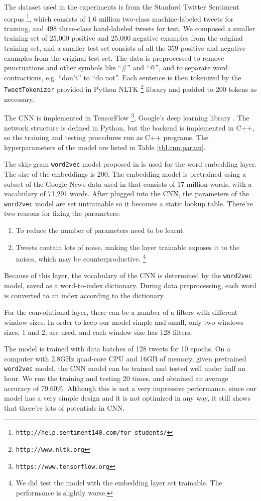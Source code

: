 The dataset used in the experiments is from the Stanford Twitter Sentiment corpus \footnote{\tt http://help.sentiment140.com/for-students/}, which consists of 1.6 million two-class machine-labeled tweets for training, and 498 three-class hand-labeled tweets for test. We composed a smaller training set of 25,000 positive and 25,000 negative examples from the original training set, and a smaller test set consists of all the 359 positive and negative examples from the original test set. The data is preprocessed to remove punctuations and other symbols like ``\#'' and ``@'', and to separate word contractions, e.g. ``don't'' to ``do not''. Each sentence is then tokenized by the {\tt TweetTokenizer} provided in Python NLTK \footnote{\tt http://www.nltk.org} library and padded to 200 tokens as necessary. 

The CNN is implemented in TensorFlow \footnote{\tt https://www.tensorflow.org}, Google's deep learning library \cite{abadi2016}. The network structure is defined in Python, but the backend is implemented in C++, so the training and testing procedures run as C++ programs. The hyperparameters of the model are listed in Table \ref{tbl.cnn.param}. 

The skip-gram {\tt word2vec} model proposed in \cite{mikolov2013} is used for the word embedding layer. The size of the embeddings is 200. The embedding model is pretrained using a subset of the Google News data used in \cite{mikolov2013} that consists of 17 million words, with a vocabulary of 71,291 words. After plugged into the CNN, the parameters of the {\tt word2vec} model are set untrainable so it becomes a static lookup table. There're two reasons for fixing the parameters:
\begin{enumerate}
\item To reduce the number of parameters need to be learnt.
\item Tweets contain lots of noise, making the layer trainable exposes it to the noises, which may be counterproductive. \footnote{We did test the model with the embedding layer set trainable. The performance is slightly worse.}
\end{enumerate}
Because of this layer, the vocabulary of the CNN is determined by the {\tt word2vec} model, saved as a word-to-index dictionary. During data preprocessing, each word is converted to an index according to the dictionary. 

For the convolutional layer, there can be a number of a filters with different window sizes. In order to keep our model simple and small, only two windows sizes, 1 and 2, are used, and each window size has 128 filters. 

The model is trained with data batches of 128 tweets for 10 epochs. On a computer with 2.8GHz quad-core CPU and 16GB of memory, given pretrained {\tt word2vec} model, the CNN model can be trained and tested well under half an hour. We run the training and testing 20 times, and obtained an average accuracy of 79.60\%. Although this is not a very impressive performance, since our model has a very simple design and it is not optimized in any way, it still shows that there're lots of potentials in CNN.